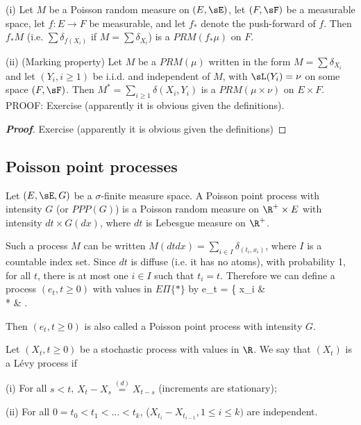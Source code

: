 \begin{proposition}
\ben
\item [(i)] Let $M$ be a Poisson random measure on $(E,\sE)$, let $(F,\sF)$ be a measurable space, let $f : E \to  F$ be measurable, and let $f_*$ denote the push-forward of $f$. Then $f_*M$ (i.e. $\sum \delta_{f (X_i )}$ if $M = \sum \delta_{X_i}$) is a $PRM( f_*\mu)$ on $F$.
\item [(ii)] (Marking property) Let $M$ be a $PRM(\mu)$ written in the form $M = \sum\delta_{X_i}$ and let $(Y_i , i \geq 1)$ be i.i.d. and independent of $M$, with $\sL(Y_i) = \nu$ on some space $(F,\sF)$. Then $M^* = \sum_{i\geq1} \delta(X_i ,Y_i )$ is a $PRM(\mu\times \nu)$ on $E \times F$.
PROOF: Exercise (apparently it is obvious given the definitions).
\een
\end{proposition}

\begin{proof}[\bf Proof]
Exercise (apparently it is obvious given the definitions)
\end{proof}

\subsection{Poisson point processes}

\begin{definition}
Let $(E,\sE,G)$ be a $\sigma$-finite measure space. A Poisson point process with intensity $G$ (or $PPP(G)$) is a Poisson random measure on $\R^+ \times E$ with intensity $d t \times G(d x)$, where $d t$ is Lebesgue measure on $\R^+$.
\end{definition}

Such a process $M$ can be written $M(d t d x) = \sum_{i\in I} \delta_{(t_i ,x_i )}$, where $I$ is a countable index set. Since $d t$ is diffuse (i.e. it has no atoms), with probability 1, for all $t$, there is at most one $i \in I$ such that $t_i = t$. Therefore we can define a process $(e_t , t \geq 0)$ with values in $E\Pi\{*\}$ by
\be
e_t = \left\{
x_i \quad\quad & \\
* & 
\ea\right.
\ee

Then $(e_t , t \geq 0)$ is also called a Poisson point process with intensity $G$.

\begin{definition}
Let $(X_t , t \geq 0)$ be a stochastic process with values in $\R$. We say that $(X_t )$ is a L\'evy process if
\ben
\item [(i)] For all $s < t$, $X_t - X_s \stackrel{(d)}{=} X_{t-s}$ (increments are stationary);
\item [(ii)] For all $0 = t_0 < t_1 < \dots < t_k$, ($X_{t_i} - X_{t_{i-1}}, 1 \leq i \leq k)$ are independent.
\een
\end{definition}

